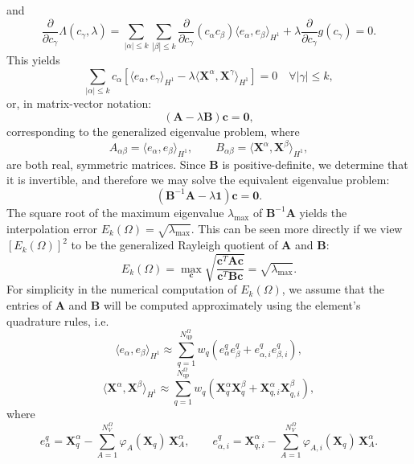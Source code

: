 and
\begin{equation}
        \frac{\partial}{\partial c_\gamma} \Lambda (c_\gamma, \lambda) = \sum_{|\alpha| \leq k} \sum_{|\beta| \leq k} \frac{\partial}{\partial c_\gamma} (c_{\alpha} c_{\beta}) \langle e_\alpha, e_\beta \rangle_{H^1} + \lambda \frac{\partial}{\partial c_\gamma} g(c_\gamma) = 0.
\end{equation}
This yields
\begin{equation}
        \sum_{|\alpha| \leq k} c_{\alpha} \left[ \langle e_\alpha, e_\gamma \rangle_{H^1} - \lambda \langle \bm{X}^\alpha, \bm{X}^\gamma \rangle_{H^1} \right] = 0 \quad \forall |\gamma| \leq k,
\end{equation}
or, in matrix-vector notation:
\begin{equation}
        (\bm{A} - \lambda \bm{B}) \bm{c} = \bm{0},
\end{equation}
corresponding to the generalized eigenvalue problem, where
\begin{equation}
        A_{\alpha \beta} = \langle e_\alpha, e_\beta \rangle_{H^1}, \qquad B_{\alpha \beta} = \langle \bm{X}^\alpha, \bm{X}^\beta \rangle_{H^1},
\end{equation}
are both real, symmetric matrices. Since $\bm{B}$ is positive-definite, we determine that it is invertible, and therefore we may solve the equivalent eigenvalue problem:
\begin{equation}
        (\bm{B}^{-1} \bm{A} - \lambda \bm{1}) \bm{c} = \bm{0}.
\end{equation}
The square root of the maximum eigenvalue $\lambda_{\max}$ of $\bm{B}^{-1} \bm{A}$ yields the interpolation error $E_k (\Omega) = \sqrt{\lambda_{\max}}$. This can be seen more directly if we view $\left[ E_k (\Omega) \right]^2$ to be the generalized Rayleigh quotient of $\bm{A}$ and $\bm{B}$:
\begin{equation}
        E_k (\Omega) = \max_{\bm{c}} \sqrt{\frac{\bm{c}^T \bm{A} \bm{c}}{\bm{c}^T \bm{B} \bm{c}}} = \sqrt{\lambda_{\max}}.
\end{equation}
For simplicity in the numerical computation of $E_k (\Omega)$, we assume that the entries of $\bm{A}$ and $\bm{B}$ will be computed approximately using the element's quadrature rules, i.e.
\begin{equation}
        \langle e_\alpha, e_\beta \rangle_{H^1} \approx \sum_{q=1}^{N^{\Omega}_{\mathrm q\mathrm p}} w_q (e_{\alpha}^{q} e_{\beta}^{q} + e_{\alpha,i}^{q} e_{\beta,i}^{q}),
\end{equation}
\begin{equation}
        \langle \bm{X}^\alpha, \bm{X}^\beta \rangle_{H^1} \approx \sum_{q=1}^{N^{\Omega}_{\mathrm q\mathrm p}} w_q (\bm{X}^{\alpha}_{q} \bm{X}^{\beta}_{q} + \bm{X}^{\alpha}_{q,i} \bm{X}^{\beta}_{q,i}),
\end{equation}
where
\begin{equation}
        e_{\alpha}^{q} = \bm{X}^{\alpha}_{q} - \sum_{A = 1}^{N^{\Omega}_V} \varphi_A (\bm{X}_{q}) \, \bm{X}_A^{\alpha}, \qquad e_{\alpha,i}^{q} = \bm{X}^{\alpha}_{q,i} - \sum_{A = 1}^{N^{\Omega}_V} \varphi_{A,i} (\bm{X}_{q}) \, \bm{X}_A^{\alpha}.
\end{equation}

